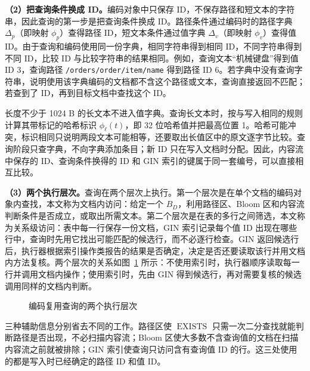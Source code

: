 \textbf{（2）把查询条件换成 ID。}编码对象中只保存 ID，不保存路径和短文本的字符串，因此查询的第一步是把查询条件换成 ID。路径条件通过编码时的路径字典 $\Delta_p$（即映射 $\phi_p$）查得路径 ID，短文本条件通过值字典 $\Delta_v$（即映射 $\phi_v$）查得值 ID。由于查询和编码使用同一份字典，相同字符串得到相同 ID，不同字符串得到不同 ID，比较 ID 与比较字符串的结果相同。例如，查询文本“机械键盘”得到值 ID 3，查询路径 \texttt{/orders/order/item/name} 得到路径 ID 6。若字典中没有查询字符串，说明使用该字典编码的文档都不含这个路径或文本，查询直接返回不匹配；若查到了 ID，再到目标文档中查找这个 ID。

长度不少于 1024 B 的长文本不进入值字典。查询长文本时，按与写入相同的规则计算其带标记的哈希标识 $\phi_\ell(t)$，即 32 位哈希值并把最高位置 1。哈希可能冲突，标识相同只说明两段文本可能相等，还要取出长值区中的原文逐字节比较。查询阶段只查字典，不向字典添加条目；新 ID 只在写入文档时分配。因此，内容流中保存的 ID、查询条件换得的 ID 和 GIN 索引的键属于同一套编号，可以直接相互比较。

\textbf{（3）两个执行层次。}查询在两个层次上执行。第一个层次是在单个文档的编码对象内查找，本文称为文档内访问：给定一个 $B_D$，利用路径区、Bloom 区和内容流判断条件是否成立，或取出所需文本。第二个层次是在表的多行之间筛选，本文称为关系级访问：表中每一行保存一份文档，GIN 索引记录每个值 ID 出现在哪些行中，查询时先用它找出可能匹配的候选行，而不必逐行检查。GIN 返回候选行后，执行器根据索引操作类报告的结果是否确定，决定是否还要读取该行并用文档内方法复核。两个层次的关系如图~\ref{fig:query-layers} 所示：不使用索引时，执行器顺序读取每一行并调用文档内操作；使用索引时，先由 GIN 得到候选行，再对需要复核的候选调用同样的文档内判断。
\begin{figure}[htbp]
\centering
{}
\caption{编码复用查询的两个执行层次}
\label{fig:query-layers}
\end{figure}
三种辅助信息分别省去不同的工作。路径区使 $\operatorname{EXISTS}$ 只需一次二分查找就能判断路径是否出现，不必扫描内容流；Bloom 区使大多数不含查询值的文档在扫描内容流之前就被排除；GIN 索引使查询只访问含有查询值 ID 的行。这三处使用的都是写入时已经确定的路径 ID 和值 ID。

